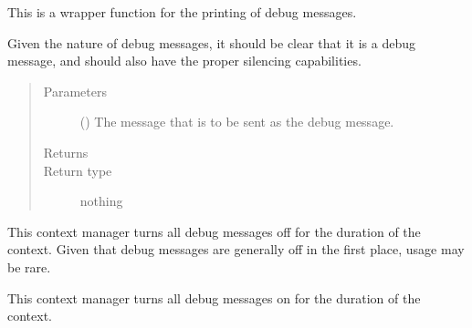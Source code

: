 \documentclass[letterpaper,10pt,english]{sphinxmanual}
\begin{document}
\begin{fulllineitems}
\label{\detokenize{python_docstrings/IfA_Smeargle.meta.errors:IfA_Smeargle.meta.errors.smeargle_debug_message}}
This is a wrapper function for the printing of debug messages.

Given the nature of debug messages, it should be clear that it is a debug
message, and should also have the proper silencing capabilities.
\begin{quote}\begin{description}
\item[{Parameters}] \leavevmode
{} () \textendash{} The message that is to be sent as the debug message.

\item[{Returns}] \leavevmode


\item[{Return type}] \leavevmode
nothing

\end{description}\end{quote}

\end{fulllineitems}


\begin{fulllineitems}
\label{\detokenize{python_docstrings/IfA_Smeargle.meta.errors:IfA_Smeargle.meta.errors.smeargle_disable_debug}}
This context manager turns all debug messages off for the duration of
the context. Given that debug messages are generally off in the first
place, usage may be rare.

\end{fulllineitems}


\begin{fulllineitems}
\label{\detokenize{python_docstrings/IfA_Smeargle.meta.errors:IfA_Smeargle.meta.errors.smeargle_enable_debug}}
This context manager turns all debug messages on for the duration of
the context.

\end{fulllineitems}
\end{document}
